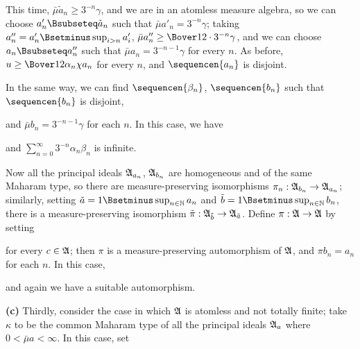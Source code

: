 {\noindent This time, $\bar\mu\tilde a_n\ge 3^{-n}\gamma$,
and we are in an atomless measure algebra, so we can choose
$a'_n\Bsubseteq\tilde a_n$ such that $\bar\mu a'_n=3^{-n}\gamma$;
taking $a''_n=a'_n\Bsetminus\sup_{i>n}a'_i$,
$\bar\mu a''_n\ge\Bover12\cdot 3^{-n}\gamma$, and we can choose
$a_n\Bsubseteq a''_n$ such that $\bar\mu a_n=3^{-n-1}\gamma$ for every $n$.
As before, $u\ge\Bover12\alpha_n\chi a_n$ for every $n$, and
$\sequencen{a_n}$ is disjoint.

In the same way, we can find $\sequencen{\beta_n}$, $\sequencen{b_n}$
such that $\sequencen{b_n}$ is disjoint,


\noindent and $\bar\mu b_n=3^{-n-1}\gamma$ for each $n$.   In this case, we
have


\noindent and $\sum_{n=0}^{\infty}3^{-n}\alpha_n\beta_n$ is infinite.

Now all the principal ideals $\frak A_{a_n}$, $\frak A_{b_n}$ are
homogeneous and of the same Maharam type, so there are
measure-preserving isomorphisms $\pi_n:\frak A_{b_n}\to\frak A_{a_n}$;
similarly, setting $\tilde a=1\Bsetminus\sup_{n\in\Bbb N}a_n$ and
$\tilde b=1\Bsetminus\sup_{n\in\Bbb N}b_n$, there is a measure-preserving
isomorphism $\tilde\pi:\frak A_{\tilde b}\to\frak A_{\tilde a}$.
Define $\pi:\frak A\to\frak A$ by setting


\noindent for every $c\in\frak A$;
then $\pi$ is a measure-preserving automorphism
of $\frak A$, and $\pi b_n=a_n$ for each $n$.   In this case,


\noindent and again we have a suitable automorphism.

\medskip

{\bf (c)} Thirdly, consider the case in which $\frak A$ is atomless and
not totally finite;  take $\kappa$ to be the common Maharam type of
all the principal ideals $\frak A_a$ where $0<\bar\mu a<\infty$.   In
this case, set


}
